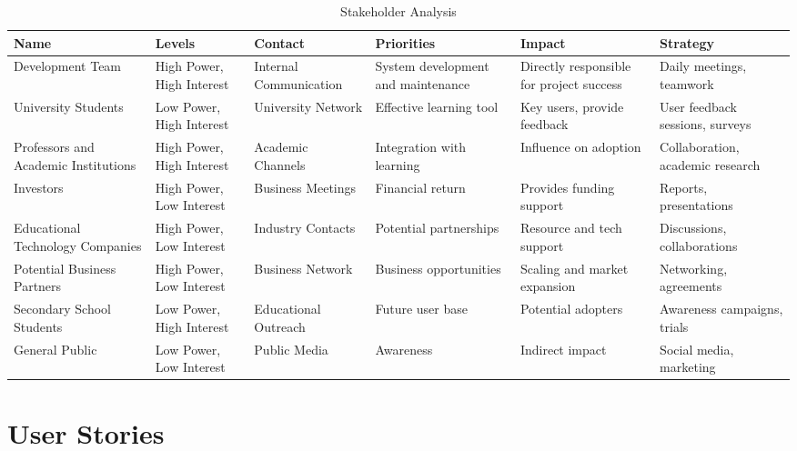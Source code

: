 \begin{table}[H]
    \centering
    \small
    \begin{tabularx}{\textwidth}{|>{\raggedright\arraybackslash}p{2.1cm}|>{\raggedright\arraybackslash}X|>{\raggedright\arraybackslash}X|>{\raggedright\arraybackslash}X|>{\raggedright\arraybackslash}X|>{\raggedright\arraybackslash}p{2.3cm}|}
        \rowcolor{gray!70}
        \hline
        \textbf{Name} & \textbf{Levels} & \textbf{Contact} & \textbf{Priorities} & \textbf{Impact} & \textbf{Strategy} \\ 
        \hline
        Development Team & High Power, High Interest & Internal Communication & System development and maintenance & Directly responsible for project success & Daily meetings, teamwork \\ 
        \hline
        University Students & Low Power, High Interest & University Network & Effective learning tool & Key users, provide feedback & User feedback sessions, surveys \\ 
        \hline
        Professors and Academic Institutions & High Power, High Interest & Academic Channels & Integration with learning & Influence on adoption & Collaboration, academic research \\ 
        \hline
        Investors & High Power, Low Interest & Business Meetings & Financial return & Provides funding support & Reports, presentations \\ 
        \hline
        Educational Technology Companies & High Power, Low Interest & Industry Contacts & Potential partnerships & Resource and tech support & Discussions, collaborations \\ 
        \hline
        Potential Business Partners & High Power, Low Interest & Business Network & Business opportunities & Scaling and market expansion & Networking, agreements \\ 
        \hline
        Secondary School Students & Low Power, High Interest & Educational Outreach & Future user base & Potential adopters & Awareness campaigns, trials \\ 
        \hline
        General Public & Low Power, Low Interest & Public Media & Awareness & Indirect impact & Social media, marketing \\ 
        \hline
    \end{tabularx}
    \caption{Stakeholder Analysis}
    \label{tab:stakeholder-analysis}
\end{table}

\section{User Stories}
\label{section:user-stories}

